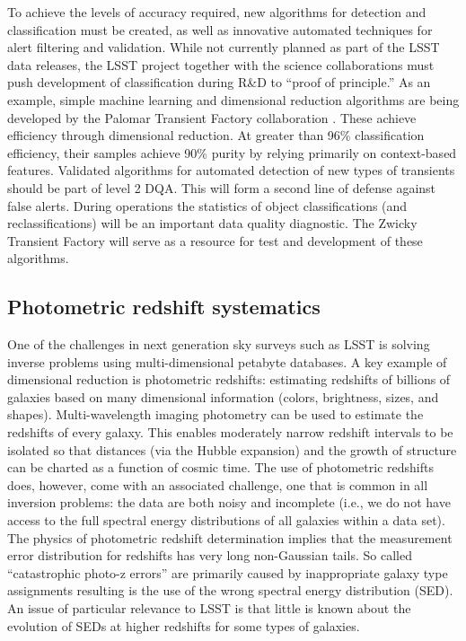 \documentclass[SE,toc,lsstdraft]{lsstdoc}
\newcommand{\newtext}[1]{{\color{blue} #1}}
\begin{document}
To achieve the levels of accuracy required, new algorithms for detection and classification must be created, as well as innovative automated techniques for alert filtering and validation.  While not currently planned as part of the LSST data releases, the LSST project together with the science collaborations must push development of classification during R\&D to ``proof of principle.''  As an example, simple machine learning and dimensional reduction algorithms are being developed by the Palomar Transient Factory collaboration \citep{2012PASP..124.1175B}.  These achieve efficiency through dimensional reduction. At greater than 96\% classification efficiency, their samples achieve 90\% purity by relying primarily on context-based features. Validated algorithms for automated detection of new types of transients should be part of level 2 DQA. This will form a second line of defense against false alerts. During operations the statistics of object classifications (and reclassifications) will be an important data quality diagnostic.
\newtext{
The Zwicky Transient Factory will serve as a resource for test and development of these algorithms.
}

\subsection{Photometric redshift systematics}

One of the challenges in next generation sky surveys such as LSST is solving inverse problems using multi-dimensional petabyte databases. A key example of dimensional reduction is photometric redshifts: estimating redshifts of billions of galaxies based on many dimensional information (colors, brightness, sizes, and shapes). Multi-wavelength imaging photometry can be used to estimate the redshifts of every galaxy.  This enables moderately narrow redshift intervals to be isolated so that distances (via the Hubble expansion) and the growth of structure can \newtext{be} charted as a function of cosmic time.  The use of photometric redshifts does, however, come with an associated challenge, one that is common in all inversion problems: the data are both noisy and incomplete (i.e., we do not have access to the full spectral energy distributions of all galaxies within a data set). The physics of photometric redshift determination implies that the measurement error distribution for redshifts has very long non-Gaussian tails. So called ``catastrophic photo-z errors'' are primarily caused by inappropriate galaxy type assignments resulting is the use of the wrong spectral energy distribution (SED). An issue of particular relevance to LSST is that little is known about the evolution of SEDs at higher redshifts for some types of galaxies.
\end{document}
